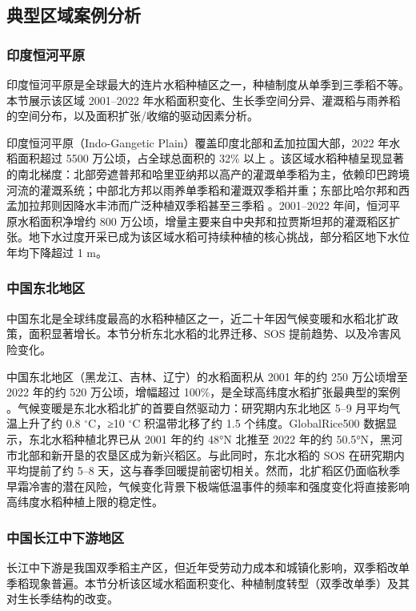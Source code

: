 \subsection{典型区域案例分析}

\subsubsection{印度恒河平原}
印度恒河平原是全球最大的连片水稻种植区之一，种植制度从单季到三季稻不等。本节展示该区域 2001--2022 年水稻面积变化、生长季空间分异、灌溉稻与雨养稻的空间分布，以及面积扩张/收缩的驱动因素分析。

印度恒河平原（Indo-Gangetic Plain）覆盖印度北部和孟加拉国大部，2022 年水稻面积超过 5500 万公顷，占全球总面积的 32\% 以上 。该区域水稻种植呈现显著的南北梯度：北部旁遮普邦和哈里亚纳邦以高产的灌溉单季稻为主，依赖印巴跨境河流的灌溉系统；中部北方邦以雨养单季稻和灌溉双季稻并重；东部比哈尔邦和西孟加拉邦则因降水丰沛而广泛种植双季稻甚至三季稻 \cite{Gumma2014}。2001--2022 年间，恒河平原水稻面积净增约 800 万公顷，增量主要来自中央邦和拉贾斯坦邦的灌溉稻区扩张。地下水过度开采已成为该区域水稻可持续种植的核心挑战，部分稻区地下水位年均下降超过 1 m。

\subsubsection{中国东北地区}
中国东北是全球纬度最高的水稻种植区之一，近二十年因气候变暖和水稻北扩政策，面积显著增长。本节分析东北水稻的北界迁移、SOS 提前趋势、以及冷害风险变化。

中国东北地区（黑龙江、吉林、辽宁）的水稻面积从 2001 年的约 250 万公顷增至 2022 年的约 520 万公顷，增幅超过 100\%，是全球高纬度水稻扩张最典型的案例 。气候变暖是东北水稻北扩的首要自然驱动力：研究期内东北地区 5--9 月平均气温上升了约 0.8 $^{\circ}\mathrm{C}$，≥10 $^{\circ}\mathrm{C}$ 积温带北移了约 1.5 个纬度。GlobalRice500 数据显示，东北水稻种植北界已从 2001 年的约 48°N 北推至 2022 年的约 50.5°N，黑河市北部和新开垦的农垦区成为新兴稻区。与此同时，东北水稻的 SOS 在研究期内平均提前了约 5--8 天，这与春季回暖提前密切相关。然而，北扩稻区仍面临秋季早霜冷害的潜在风险，气候变化背景下极端低温事件的频率和强度变化将直接影响高纬度水稻种植上限的稳定性。

\subsubsection{中国长江中下游地区}
长江中下游是我国双季稻主产区，但近年受劳动力成本和城镇化影响，双季稻改单季稻现象普遍。本节分析该区域水稻面积变化、种植制度转型（双季改单季）及其对生长季结构的改变。

